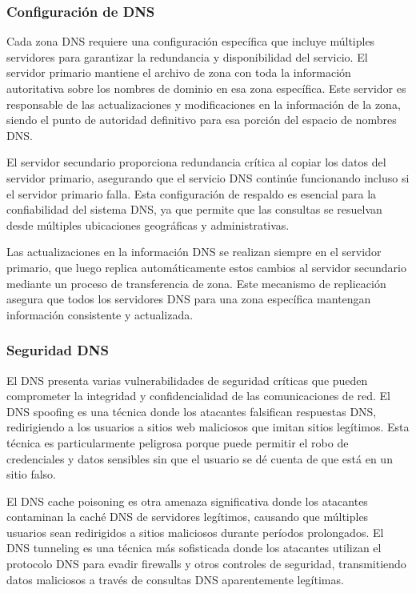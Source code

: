 \subsubsection{Configuración de DNS}

Cada zona DNS requiere una configuración específica que incluye múltiples servidores para garantizar la redundancia y disponibilidad del servicio. El servidor primario mantiene el archivo de zona con toda la información autoritativa sobre los nombres de dominio en esa zona específica. Este servidor es responsable de las actualizaciones y modificaciones en la información de la zona, siendo el punto de autoridad definitivo para esa porción del espacio de nombres DNS.

El servidor secundario proporciona redundancia crítica al copiar los datos del servidor primario, asegurando que el servicio DNS continúe funcionando incluso si el servidor primario falla. Esta configuración de respaldo es esencial para la confiabilidad del sistema DNS, ya que permite que las consultas se resuelvan desde múltiples ubicaciones geográficas y administrativas.

Las actualizaciones en la información DNS se realizan siempre en el servidor primario, que luego replica automáticamente estos cambios al servidor secundario mediante un proceso de transferencia de zona. Este mecanismo de replicación asegura que todos los servidores DNS para una zona específica mantengan información consistente y actualizada.

\subsubsection{Seguridad DNS}

El DNS presenta varias vulnerabilidades de seguridad críticas que pueden comprometer la integridad y confidencialidad de las comunicaciones de red. El DNS spoofing es una técnica donde los atacantes falsifican respuestas DNS, redirigiendo a los usuarios a sitios web maliciosos que imitan sitios legítimos. Esta técnica es particularmente peligrosa porque puede permitir el robo de credenciales y datos sensibles sin que el usuario se dé cuenta de que está en un sitio falso.

El DNS cache poisoning es otra amenaza significativa donde los atacantes contaminan la caché DNS de servidores legítimos, causando que múltiples usuarios sean redirigidos a sitios maliciosos durante períodos prolongados. El DNS tunneling es una técnica más sofisticada donde los atacantes utilizan el protocolo DNS para evadir firewalls y otros controles de seguridad, transmitiendo datos maliciosos a través de consultas DNS aparentemente legítimas.

